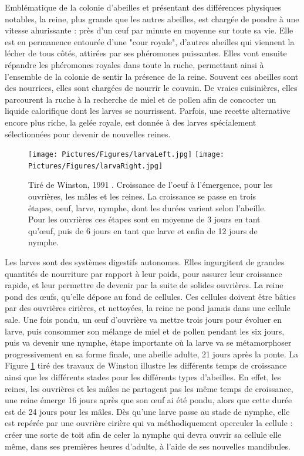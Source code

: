 			Emblématique de la colonie d'abeilles et présentant des différences physiques notables, la reine, plus grande que les autres abeilles, est chargée de pondre à une vitesse ahurissante : près d'un œuf par minute en moyenne sur toute sa vie. Elle est en permanence entourée d'une "cour royale", d'autres abeilles qui viennent la lécher de tous côtés, attirées par ses phéromones puissantes. Elles vont ensuite répandre les phéromones royales dans toute la ruche, permettant ainsi à l'ensemble de la colonie de sentir la présence de la reine. Souvent ces abeilles sont des nourrices, elles sont chargées de nourrir le couvain. De vraies cuisinières, elles parcourent la ruche à la recherche de miel et de pollen afin de concocter un liquide calorifique dont les larves se nourrissent. Parfois, une recette alternative encore plus riche, la gelée royale, est donnée à des larves spécialement sélectionnées pour devenir de nouvelles reines.
			
			\begin{figure}
			\centering
			\texttt{[image: Pictures/Figures/larvaLeft.jpg]}
			\texttt{[image: Pictures/Figures/larvaRight.jpg]}
			\caption{Tiré de Winston, 1991 \cite{winston_biology_1991}. Croissance de l'oeuf à l'émergence, pour les ouvrières, les mâles et les reines. La croissance se passe en trois étapes, oeuf, larve, nymphe, dont les durées varient selon l'abeille. Pour les ouvrières ces étapes sont en moyenne de 3 jours en tant qu'œuf, puis de 6 jours en tant que larve et enfin de 12 jours de nymphe.}
			\label{LarvaDev}
			\end{figure}
			
			Les larves sont des systèmes digestifs autonomes. Elles ingurgitent de grandes quantités de nourriture par rapport à leur poids, pour assurer leur croissance rapide, et leur permettre de devenir par la suite de solides ouvrières. La reine pond des œufs, qu'elle dépose au fond de cellules. Ces cellules doivent être bâties par des ouvrières cirières, et nettoyées, la reine ne pond jamais dans une cellule sale. Une fois pondu, un œuf d'ouvrière va mettre trois jours pour évoluer en larve, puis consommer son mélange de miel et de pollen pendant les six jours, puis va devenir une nymphe, étape importante où la larve va se métamorphoser progressivement en sa forme finale, une abeille adulte, 21 jours après la ponte. La Figure \ref{LarvaDev} tiré des travaux de Winston \cite{winston_biology_1991} illustre les différents temps de croissance ainsi que les différents stades pour les différents types d'abeilles. En effet, les reines, les ouvrières et les mâles ne partagent pas les même temps de croissance, une reine émerge 16 jours après que son œuf ai été pondu, alors que cette durée est de 24 jours pour les mâles. Dès qu'une larve passe au stade de nymphe, elle est repérée par une ouvrière cirière qui va méthodiquement operculer la cellule : créer une sorte de toit afin de celer la nymphe qui devra ouvrir sa cellule elle même, dans ses premières heures d'adulte, à l'aide de ses nouvelles mandibules.
			
